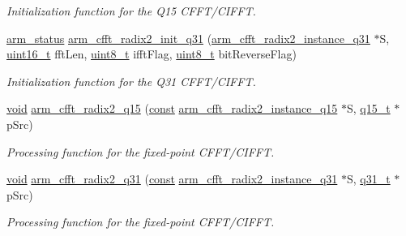 \begin{DoxyCompactItemize}
\begin{DoxyCompactList}\small\item\em Initialization function for the Q15 C\-F\-F\-T/\-C\-I\-F\-F\-T. \end{DoxyCompactList}\item 
\hyperlink{arm__math_8h_a5e459c6409dfcd2927bb8a57491d7cf6}{arm\-\_\-status} \hyperlink{group___radix2___c_f_f_t___c_i_f_f_t_gabec9611e77382f31e152668bf6b4b638}{arm\-\_\-cfft\-\_\-radix2\-\_\-init\-\_\-q31} (\hyperlink{structarm__cfft__radix2__instance__q31}{arm\-\_\-cfft\-\_\-radix2\-\_\-instance\-\_\-q31} $\ast$S, \hyperlink{stdint_8h_a273cf69d639a59973b6019625df33e30}{uint16\-\_\-t} fft\-Len, \hyperlink{stdint_8h_aba7bc1797add20fe3efdf37ced1182c5}{uint8\-\_\-t} ifft\-Flag, \hyperlink{stdint_8h_aba7bc1797add20fe3efdf37ced1182c5}{uint8\-\_\-t} bit\-Reverse\-Flag)
\begin{DoxyCompactList}\small\item\em Initialization function for the Q31 C\-F\-F\-T/\-C\-I\-F\-F\-T. \end{DoxyCompactList}\item 
\hyperlink{group___n_a_m_e_ga18028b8badbf1ea7e704ccac3c488e82}{void} \hyperlink{group___radix2___c_f_f_t___c_i_f_f_t_ga55b424341dc3efd3fa0bcaaff4bdbf40}{arm\-\_\-cfft\-\_\-radix2\-\_\-q15} (\hyperlink{group___n_a_m_e_ga7ae6d0e43244213b34de2c2b9aa30da6}{const} \hyperlink{structarm__cfft__radix2__instance__q15}{arm\-\_\-cfft\-\_\-radix2\-\_\-instance\-\_\-q15} $\ast$S, \hyperlink{arm__math_8h_ab5a8fb21a5b3b983d5f54f31614052ea}{q15\-\_\-t} $\ast$p\-Src)
\begin{DoxyCompactList}\small\item\em Processing function for the fixed-\/point C\-F\-F\-T/\-C\-I\-F\-F\-T. \end{DoxyCompactList}\item 
\hyperlink{group___n_a_m_e_ga18028b8badbf1ea7e704ccac3c488e82}{void} \hyperlink{group___radix2___c_f_f_t___c_i_f_f_t_ga6321f703ec87a274aedaab33d3e766b4}{arm\-\_\-cfft\-\_\-radix2\-\_\-q31} (\hyperlink{group___n_a_m_e_ga7ae6d0e43244213b34de2c2b9aa30da6}{const} \hyperlink{structarm__cfft__radix2__instance__q31}{arm\-\_\-cfft\-\_\-radix2\-\_\-instance\-\_\-q31} $\ast$S, \hyperlink{arm__math_8h_adc89a3547f5324b7b3b95adec3806bc0}{q31\-\_\-t} $\ast$p\-Src)
\begin{DoxyCompactList}\small\item\em Processing function for the fixed-\/point C\-F\-F\-T/\-C\-I\-F\-F\-T. \end{DoxyCompactList}\end{DoxyCompactItemize}


